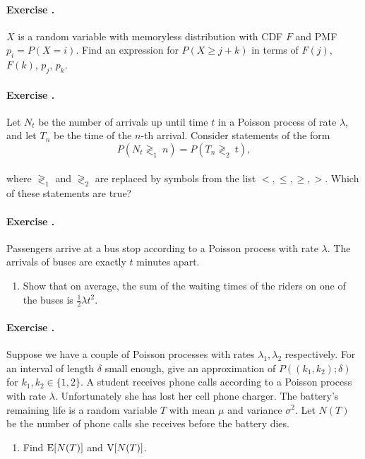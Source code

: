 \documentclass[twocolumn,12pt,a4paper]{article}
\newcounter{num}  %
\begin{document}
	\paragraph{Exercise \thenum.}
	$X$ is a random variable with memoryless distribution with CDF $F$ and PMF $p_i = P(X = i)$.
	Find an expression for $P(X \geq j + k)$ in terms of $F(j)$, $F(k)$, $p_j$, $p_k$.
	
	\paragraph{Exercise \thenum.}
	Let $N_t$ be the number of arrivals up until time $t$ in a Poisson process of rate $\lambda$, and let $T_n$ be the time of the $n$-th arrival. Consider statements of the form
	\[
	P(N_t  \gtrless_1 \ n) = P(T_n \gtrless_2 \ t),
	\]\\
	where $\gtrless_1$ and $\gtrless_2$ are replaced by symbols from the list $<, \leq, \geq, >$. Which of these statements are true?
	
	
	\paragraph{Exercise \thenum.}
	Passengers arrive at a bus stop according to a Poisson process with rate $\lambda$. The arrivals of buses are exactly $t$ minutes apart. 
	\begin{enumerate}
		\item 
	Show that on average, the sum of the waiting times of the riders on one of the buses is $\frac 1 2 \lambda t^2$.
	\end{enumerate}
	
	
	\paragraph{Exercise \thenum.}
	Suppose we have a couple of Poisson processes with rates $\lambda_1, \lambda_2$ respectively. 
	For an interval of length $ \delta$ small enough, give an approximation of $P((k_1,k_2);\delta)$ for $k_1,k_2\in\{1,2\}$.
	A student receives phone calls according to a Poisson process with rate $ \lambda$. 
	Unfortunately she has lost her cell phone charger. 
	The battery's remaining life is a random variable $T$ with mean $\mu$ and variance $\sigma^2$. Let $N(T)$ be the number of phone calls she receives before the battery dies.
	\begin{enumerate}
		\item Find $ {\rm E}[N(T)]$ and ${\rm V}[N(T)]$.
	\end{enumerate}
	
\end{document}
